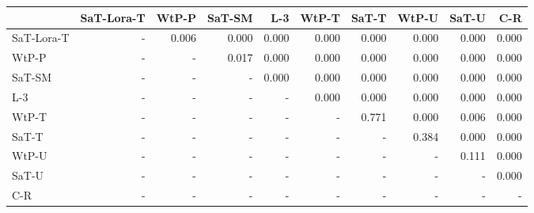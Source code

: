 \begin{tabular}{lrrrrrrrrr}
\toprule
 & SaT-Lora-T & WtP-P & SaT-SM & L-3 & WtP-T & SaT-T & WtP-U & SaT-U & C-R \\
\midrule
SaT-Lora-T & - & 0.006 & 0.000 & 0.000 & 0.000 & 0.000 & 0.000 & 0.000 & 0.000 \\
WtP-P & - & - & 0.017 & 0.000 & 0.000 & 0.000 & 0.000 & 0.000 & 0.000 \\
SaT-SM & - & - & - & 0.000 & 0.000 & 0.000 & 0.000 & 0.000 & 0.000 \\
L-3 & - & - & - & - & 0.000 & 0.000 & 0.000 & 0.000 & 0.000 \\
WtP-T & - & - & - & - & - & 0.771 & 0.000 & 0.006 & 0.000 \\
SaT-T & - & - & - & - & - & - & 0.384 & 0.000 & 0.000 \\
WtP-U & - & - & - & - & - & - & - & 0.111 & 0.000 \\
SaT-U & - & - & - & - & - & - & - & - & 0.000 \\
C-R & - & - & - & - & - & - & - & - & - \\
\bottomrule
\end{tabular}


